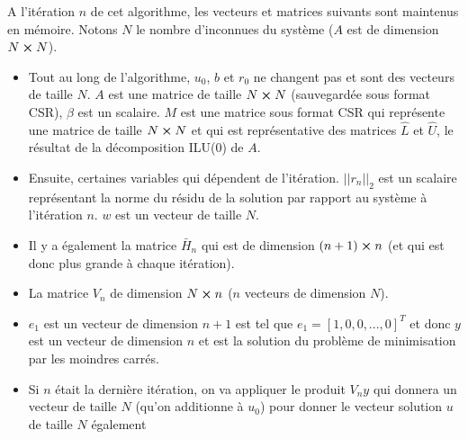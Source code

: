 \documentclass[11pt]{article}
\begin{document}
\vspace{12pt}
A l'itération $n$ de cet algorithme, les vecteurs et matrices suivants sont maintenus en mémoire. Notons $N$ le nombre d'inconnues du système ($A$ est de dimension $N \cross N$). 
\begin{itemize}
    \item Tout au long de l'algorithme, $u_0$, $b$ et $r_0$ ne changent pas et sont des vecteurs de taille $N$. $A$ est une matrice de taille $N \cross N$ (sauvegardée sous format CSR), $\beta$ est un scalaire. $M$ est une matrice sous format CSR qui représente une matrice de taille $N \cross N$ et qui est représentative des matrices $\hat{L}$ et $\hat{U}$, le résultat de la décomposition ILU(0) de $A$.
    \item Ensuite, certaines variables qui dépendent de l'itération. $||r_n||_2$ est un scalaire représentant la norme du résidu de la solution par rapport au système à l'itération $n$. $w$ est un vecteur de taille $N$.
    \item Il y a également la matrice $\bar{H}_n$ qui est de dimension $(n+1) \cross n$ (et qui est donc plus grande à chaque itération).
    \item La matrice $V_n$ de dimension $N \cross n$ ($n$ vecteurs de dimension $N$). 
    \item $e_1$ est un vecteur de dimension $n+1$ est tel que $e_1 = [1, 0, 0, ..., 0]^T$ et donc $y$ est un vecteur de dimension $n$ et est la solution du problème de minimisation par les moindres carrés. 
    \item Si $n$ était la dernière itération, on va appliquer le produit $V_n y$ qui donnera un vecteur de taille $N$ (qu'on additionne à $u_0$) pour donner le vecteur solution $u$ de taille $N$ également
\end{itemize}
\end{document}
